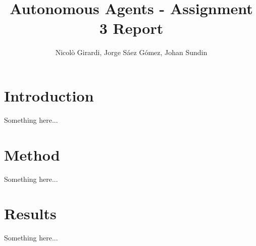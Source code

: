 \documentclass[a4paper,10pt]{article}
\title{Autonomous Agents - Assignment 3 Report}
\author{Nicolò Girardi, Jorge Sáez Gómez, Johan Sundin}
\begin{document}
\maketitle

\section{Introduction}

Something here...

\section{Method}

Something here...

\section{Results}

Something here...
\end{document}
